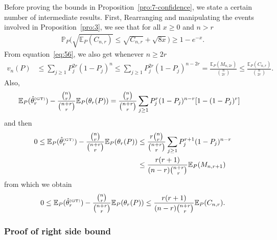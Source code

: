 \documentclass{article}
\newcommand{\1}{\boldsymbol{1}}
\newcommand{\EE}{\mathbb{E}}
\newcommand{\PP}{\mathbb{P}}
\theoremstyle{plain}
\begin{document}
Before proving the bounds in Proposition~\ref{pro:7-confidence}, we state a certain number of intermediate results. First, Rearranging and manipulating the events involved in Proposition~\ref{pro:3}, we see that for all $x \geq 0$ and $n > r$
\begin{gather}
  \label{eq:30}
  \PP_P\Big(\sqrt{\EE_P(C_{n,r})} \leq \sqrt{C_{n,r}} + \sqrt{8x} \Big) \geq 1 - e^{-x}.
\end{gather}
From equation~\eqref{eq:56}, we also get whenever $n \geq 2r$
\begin{align}
  \label{eq:42}
  v_n(P)%
  &\leq \sum_{j\geq 1}P_j^{2r}(1 - P_j)^n%
  \leq \sum_{j\geq 1}P_j^{2r}(1 - P_j)^{n-2r}%
    = \frac{\EE_P(M_{n,2r})}{\binom{n}{2r}}%
    \leq \frac{\EE_P(C_{n,r})}{\binom{n}{2r}}.
\end{align}
Also,
\begin{align*}
  \EE_P(\hat{\theta}_r^{\text{\tiny{(GT)}}}) - \frac{\binom{n}{r}}{\binom{n+r}{r}} \EE_P(\theta_r(P))%
  &= \frac{\binom{n}{r}}{\binom{n+r}{r}}\sum_{j\geq 1}P_j^r(1-P_j)^{n-r}[1 - (1-P_j)^r]
\end{align*}
and then
\begin{align*}
  0 \leq%
  \EE_P(\hat{\theta}_r^{\text{\tiny{(GT)}}}) - \frac{\binom{n}{r}}{\binom{n+r}{r}} \EE_P(\theta_r(P))
  &\leq \frac{r \binom{n}{r}}{\binom{n+r}{r}}\sum_{j\geq 1}P_j^{r+1}(1-P_j)^{n-r}\\
  &\leq \frac{r(r+1)}{(n-r)\binom{n+r}{r}}\EE_P(M_{n,r+1})
\end{align*}
from which we obtain
\begin{align}
  \label{eq:40}
  0%
  \leq \EE_P(\hat{\theta}_r^{\text{\tiny{(GT)}}}) - \frac{\binom{n}{r}}{\binom{n+r}{r}} \EE_P(\theta_r(P))%
  \leq \frac{r(r+1)}{(n-r)\binom{n+r}{r}}\EE_P(C_{n,r}).
\end{align}


\subsubsection{Proof of right side bound}
\end{document}
